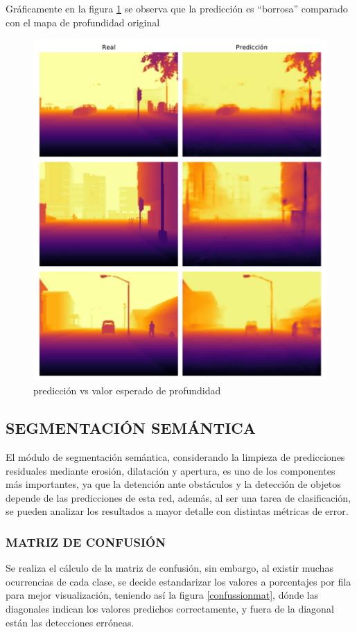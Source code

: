 	Gráficamente en la figura \ref{depthpred} se observa que la predicción es ``borrosa'' comparado con el mapa de profundidad original
	
	\begin{figure}[H]
		\centering
		\includegraphics[scale=0.6]{imagenes/preds/depth}
		\caption[Predicción vs valor esperado de profundidad]{predicción vs valor esperado de profundidad}
		\label{depthpred}
	\end{figure}
	
\subsection{SEGMENTACIÓN SEMÁNTICA}
El módulo de segmentación semántica, considerando la limpieza de predicciones residuales mediante erosión, dilatación y apertura, es uno de los componentes más importantes, ya que la detención ante obstáculos y la detección de objetos depende de las predicciones de esta red, además, al ser una tarea de clasificación, se pueden analizar los resultados a mayor detalle con distintas métricas de error.
	\subsubsection{MATRIZ DE CONFUSIÓN}
	Se realiza el cálculo de la matriz de confusión, sin embargo, al existir muchas ocurrencias de cada clase, se decide estandarizar los valores a porcentajes por fila para mejor visualización, teniendo así la figura \ref{confussionmat}, dónde las diagonales indican los valores predichos correctamente, y fuera de la diagonal están las detecciones erróneas.
	
